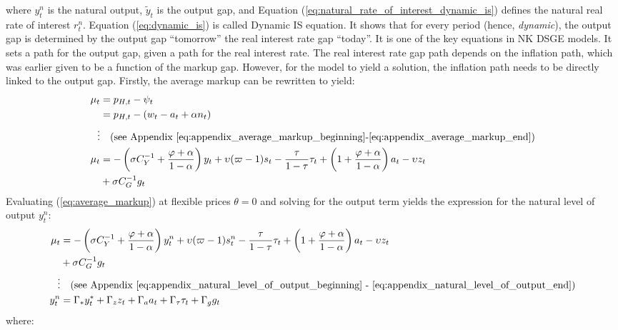where $y^n_{t}$ is the natural output, $\tilde{y}_t$ is the output gap, and Equation (\ref{eq:natural_rate_of_interest_dynamic_is}) defines the natural real rate of interest $r_t^n$. Equation (\ref{eq:dynamic_is}) is called Dynamic IS equation. It shows that for every period (hence, \textit{dynamic}), the output gap is determined by the output gap ``tomorrow'' the real interest rate gap ``today''. It is one of the key equations in NK DSGE models. It sets a path for the output gap, given a path for the real interest rate. The real interest rate gap path depends on the inflation path, which was earlier given to be a function of the markup gap. However, for the model to yield a solution, the inflation path needs to be directly linked to the output gap. Firstly, the average markup can be rewritten to yield:
\begin{align}
 \mu_t &= p_{H,t} - \psi_t \\
 &= p_{H,t} - (w_t - a_t + \alpha n_t) \nonumber \\
 \vdots & \quad \text{(see Appendix \ref{eq:appendix_average_markup_beginning}-\ref{eq:appendix_average_markup_end})} \nonumber \\
 \mu_t &= -\left(\sigma C_Y^{-1} + \frac{\varphi + \alpha}{1-\alpha}\right)y_t + \upsilon (\varpi - 1) s_t - \frac{\tau}{1-\tau}\tau_t + \left(1 + \frac{\varphi + \alpha}{1-\alpha}\right)a_t - \upsilon z_t \nonumber \\ 
 &+ \sigma C_G^{-1} g_t \label{eq:average_markup}
\end{align}
Evaluating (\ref{eq:average_markup}) at flexible prices $\theta=0$ and solving for the output term yields the expression for the natural level of output $y_t^n$:
\begin{align}
 \mu_t &= -\left(\sigma C_Y^{-1} + \frac{\varphi + \alpha}{1-\alpha}\right)y^n_t + \upsilon (\varpi - 1) s^n_t - \frac{\tau}{1-\tau}\tau_t + \left(1 + \frac{\varphi + \alpha}{1-\alpha}\right)a_t - \upsilon z_t \nonumber \\ 
 &+ \sigma C_G^{-1} g_t \label{eq:average_markup_flexible_prices}\\
 \vdots & \quad \text{(see Appendix \ref{eq:appendix_natural_level_of_output_beginning} - \ref{eq:appendix_natural_level_of_output_end})} \nonumber \\
 y^n_t &= \Gamma_* y^*_t + \Gamma_z z_t + \Gamma_a a_t + \Gamma_\tau \tau_t + \Gamma_g g_t \label{eq:natural_output}
\end{align}
where:
